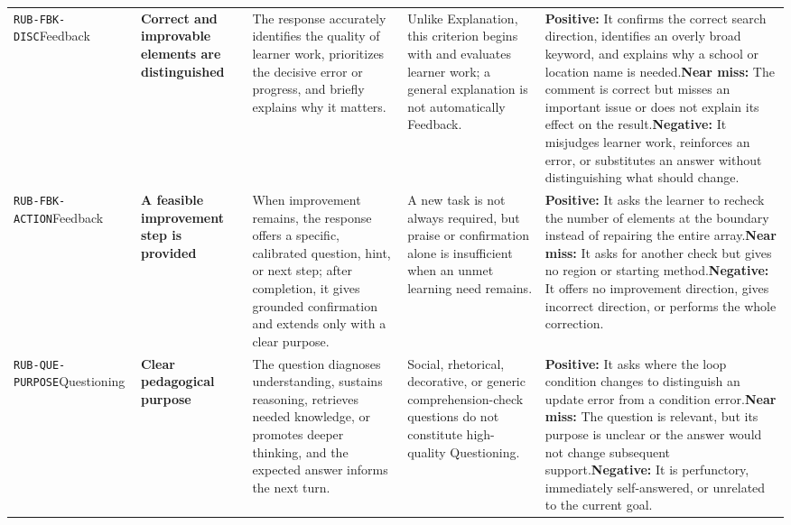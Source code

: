 \documentclass[conference]{IEEEtran}
\begin{document}
\begin{longtable}{P{0.14\textwidth}P{0.17\textwidth}P{0.20\textwidth}P{0.17\textwidth}P{0.24\textwidth}}
\texttt{RUB-FBK-DISC}\newline{}Feedback & \textbf{Correct and improvable elements are distinguished} & The response accurately identifies the quality of learner work, prioritizes the decisive error or progress, and briefly explains why it matters. & Unlike Explanation, this criterion begins with and evaluates learner work; a general explanation is not automatically Feedback. & \textbf{Positive:} It confirms the correct search direction, identifies an overly broad keyword, and explains why a school or location name is needed.\newline\textbf{Near miss:} The comment is correct but misses an important issue or does not explain its effect on the result.\newline\textbf{Negative:} It misjudges learner work, reinforces an error, or substitutes an answer without distinguishing what should change. \\
\texttt{RUB-FBK-ACTION}\newline{}Feedback & \textbf{A feasible improvement step is provided} & When improvement remains, the response offers a specific, calibrated question, hint, or next step; after completion, it gives grounded confirmation and extends only with a clear purpose. & A new task is not always required, but praise or confirmation alone is insufficient when an unmet learning need remains. & \textbf{Positive:} It asks the learner to recheck the number of elements at the boundary instead of repairing the entire array.\newline\textbf{Near miss:} It asks for another check but gives no region or starting method.\newline\textbf{Negative:} It offers no improvement direction, gives incorrect direction, or performs the whole correction. \\
\texttt{RUB-QUE-PURPOSE}\newline{}Questioning & \textbf{Clear pedagogical purpose} & The question diagnoses understanding, sustains reasoning, retrieves needed knowledge, or promotes deeper thinking, and the expected answer informs the next turn. & Social, rhetorical, decorative, or generic comprehension-check questions do not constitute high-quality Questioning. & \textbf{Positive:} It asks where the loop condition changes to distinguish an update error from a condition error.\newline\textbf{Near miss:} The question is relevant, but its purpose is unclear or the answer would not change subsequent support.\newline\textbf{Negative:} It is perfunctory, immediately self-answered, or unrelated to the current goal. \\

\end{longtable}
\end{document}
